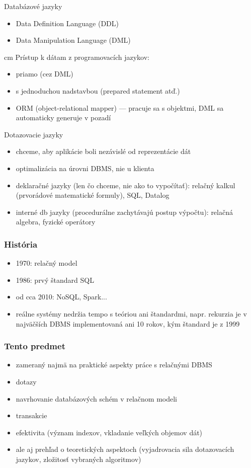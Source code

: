 \documentclass[12pt]{beamer}
\begin{document}
\begin{frame}
Databázové jazyky
\begin{itemize}
\item Data Definition Language (DDL)
\item Data Manipulation Language (DML)
\end{itemize}
 cm
\pause
Prístup k dátam z programovacích jazykov:
\begin{itemize}
\item priamo (cez DML)
\item s jednoduchou nadstavbou (prepared statement atď.)
\item ORM (object-relational mapper) --- pracuje sa s objektmi, DML sa automaticky generuje v pozadí 
\end{itemize}
\end{frame}

\begin{frame}
Dotazovacie jazyky
\begin{itemize}
\item chceme, aby aplikácie boli nezávislé od reprezentácie dát
\item optimalizácia na úrovni DBMS, nie u klienta
\pause
\item deklaračné jazyky (len čo chceme, nie ako to vypočítať): relačný kalkul (prvorádové matematické formuly), SQL, Datalog
\pause
\item interné db jazyky (procedurálne zachytávajú postup výpočtu): relačná algebra, fyzické operátory
\end{itemize}
\end{frame}

\begin{frame}
\frametitle{História}
\begin{itemize}
\item 1970: relačný model
\item 1986: prvý štandard SQL
\item od cca 2010: NoSQL, Spark...
\pause
\item reálne systémy nedržia tempo s teóriou ani štandardmi, napr. rekurzia je v najväčších DBMS implementovaná ani 10 rokov, kým štandard je z 1999
\end{itemize}
\end{frame}

\begin{frame}
\frametitle{Tento predmet}
\begin{itemize}
\item zameraný najmä na praktické aspekty práce s relačnými DBMS
\item dotazy
\item navrhovanie databázových schém v relačnom modeli
\item transakcie
\item efektivita (význam indexov, vkladanie veľkých objemov dát)
\pause
\item ale aj prehľad o teoretických aspektoch (vyjadrovacia sila dotazovacích jazykov, zložitosť vybraných algoritmov)
\end{itemize}
\end{frame}
\end{document}
